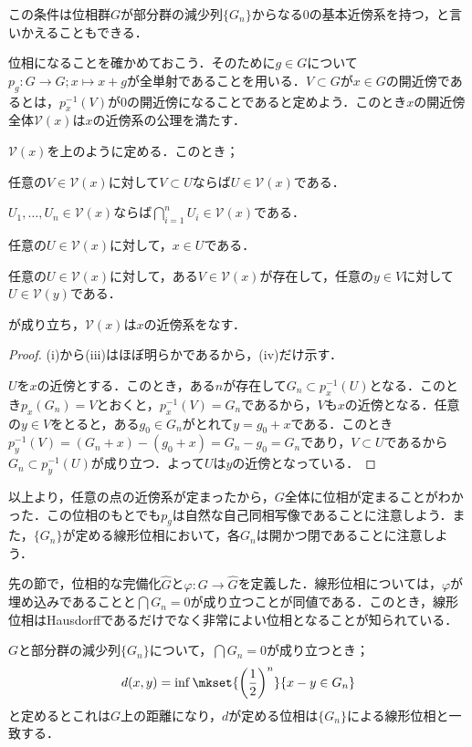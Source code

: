 この条件は位相群$G$が部分群の減少列$\{G_n\}$からなる$0$の基本近傍系を持つ，と言いかえることもできる．

位相になることを確かめておこう．そのために$g\in G$について$p_g:G\to G;x\mapsto x+g$が全単射であることを用いる．$V\subset G$が$x\in G$の開近傍であるとは，$p_x^{-1}(V)$が$0$の開近傍になることであると定めよう．このとき$x$の開近傍全体$\mathcal{V}(x)$は$x$の近傍系の公理を満たす．

\begin{lem}
	$\mathcal{V}(x)$を上のように定める．このとき；
	\begin{sakura}
		\item 任意の$V\in\mathcal{V}(x)$に対して$V\subset U$ならば$U\in\mathcal{V}(x)$である．
		\item $U_1,\dots,U_n\in\mathcal{V}(x)$ならば$\bigcap_{i=1}^n U_i\in\mathcal{V}(x)$である．
		\item 任意の$U\in\mathcal{V}(x)$に対して，$x\in U$である．
		\item 任意の$U\in\mathcal{V}(x)$に対して，ある$V\in\mathcal{V}(x)$が存在して，任意の$y\in V$に対して$U\in\mathcal{V}(y)$である．
	\end{sakura}
	が成り立ち，$\mathcal{V}(x)$は$x$の近傍系をなす．
\end{lem}

\begin{proof}

	(i)から(iii)はほぼ明らかであるから，(iv)だけ示す．
	
	$U$を$x$の近傍とする．このとき，ある$n$が存在して$G_n\subset p_x^{-1}(U)$となる．このとき$p_x(G_n)=V$とおくと，$p_x^{-1}(V)=G_n$であるから，$V$も$x$の近傍となる．任意の$y\in V$をとると，ある$g_0\in G_n$がとれて$y=g_0+x$である．このとき$p_y^{-1}(V)=(G_n+x)-(g_0+x)=G_n-g_0=G_n$であり，$V\subset U$であるから$G_n\subset p_y^{-1}(U)$が成り立つ．よって$U$は$y$の近傍となっている．
\end{proof}

以上より，任意の点の近傍系が定まったから，$G$全体に位相が定まることがわかった．この位相のもとでも$p_g$は自然な自己同相写像であることに注意しよう．また，$\{G_n\}$が定める線形位相において，各$G_n$は開かつ閉であることに注意しよう．

先の節で，位相的な完備化$\widehat{G}$と$\varphi:G\to\widehat{G}$を定義した．線形位相については，$\varphi$が埋め込みであることと$\bigcap G_n=0$が成り立つことが同値である．このとき，線形位相はHausdorffであるだけでなく非常によい位相となることが知られている．

\begin{prop}
	$G$と部分群の減少列$\{G_n\}$について，$\bigcap G_n=0$が成り立つとき；
	\[d(x,y)=\inf\mkset{\left(\frac{1}{2}\right)^n}{x-y\in G_n}\]
	と定めるとこれは$G$上の距離になり，$d$が定める位相は$\{G_n\}$による線形位相と一致する．
\end{prop}

